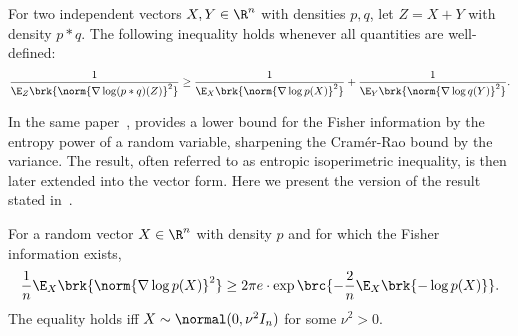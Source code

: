 \documentclass[11pt]{article}
\begin{document}
\begin{lemma} \label{lem:FII} For two independent vectors $X, Y \in \R^n$ with densities $p, q$, let $Z = X + Y$ with density $p*q$. The following inequality holds whenever all quantities are well-defined:
\begin{align*}
    \frac{1}{\E_{Z} \brk{\norm{\nabla \log (p*q)(Z)}^2}} \geq \frac{1}{\E_{X} \brk{\norm{\nabla \log p(X)}^2}} + \frac{1}{\E_{Y} \brk{\norm{\nabla \log q(Y)}^2}}.
\end{align*}
\end{lemma}
In the same paper~\citep{stam1959some}, \citeauthor{stam1959some} provides a lower bound for the Fisher information by the entropy power of a random variable, sharpening the Cram\'{e}r-Rao bound by the variance. The result, often referred to as entropic isoperimetric inequality, is then later extended into the vector form. Here we present the version of the result stated in~\cite[Thm.~16]{dembo2002information}.
\begin{lemma} \label{lem:EII} For a random vector $X \in \R^n$ with density $p$ and for which the Fisher information exists,
\begin{align*}
    \frac{1}{n} \E_{X} \brk{\norm{\nabla \log p(X)}^2} \geq 2\pi e \cdot \exp \brc{-\frac{2}{n} \E_{X} \brk{-\log p(X)}}.
\end{align*}   
The equality holds iff $X \sim \normal(0, \nu^2 I_n)$ for some $\nu^2 > 0$.
\end{lemma}
\end{document}
